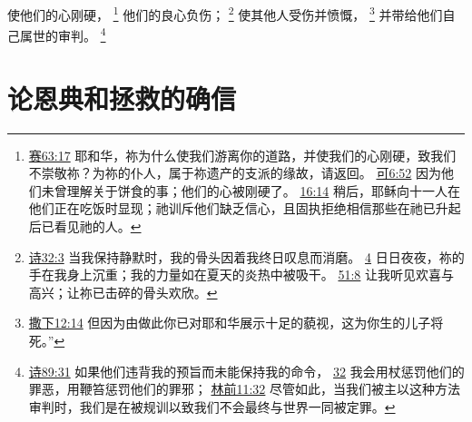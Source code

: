\documentclass[12pt, a4paper, oneside]{ctexart}
\begin{document}
	使他们的心刚硬，
	\footnote {
		\href{https://biblehub.com/isaiah/63-17.htm}{赛63:17} 耶和华，祢为什么使我们游离你的道路，并使我们的心刚硬，致我们不崇敬祢？为祢的仆人，属于祢遗产的支派的缘故，请返回。
		\href{https://biblehub.com/mark/6-52.htm}{可6:52} 因为他们未曾理解关于饼食的事；他们的心被刚硬了。
		\href{https://biblehub.com/mark/16-14.htm}{16:14} 稍后，耶稣向十一人在他们正在吃饭时显现；祂训斥他们缺乏信心，且固执拒绝相信那些在祂已升起后已看见祂的人。
	}
	他们的良心负伤；
	\footnote {
		\href{https://biblehub.com/psalms/32-3.htm}{诗32:3} 当我保持静默时，我的骨头因着我终日叹息而消磨。
		\href{https://biblehub.com/psalms/32-4.htm}{4} 日日夜夜，祢的手在我身上沉重；我的力量如在夏天的炎热中被吸干。
		\href{https://biblehub.com/psalms/51-8.htm}{51:8} 让我听见欢喜与高兴；让祢已击碎的骨头欢欣。
	}
	使其他人受伤并愤慨，
	\footnote {
		\href{https://biblehub.com/2_samuel/12-14.htm}{撒下12:14} 但因为由做此你已对耶和华展示十足的藐视，这为你生的儿子将死。”
	}
	并带给他们自己属世的审判。
	\footnote {
		\href{https://biblehub.com/psalms/89-31.htm}{诗89:31} 如果他们违背我的预旨而未能保持我的命令，
		\href{https://biblehub.com/psalms/89-32.htm}{32} 我会用杖惩罚他们的罪恶，用鞭笞惩罚他们的罪邪；
		\href{https://biblehub.com/1_corinthians/11-32.htm}{林前11:32} 尽管如此，当我们被主以这种方法审判时，我们是在被规训以致我们不会最终与世界一同被定罪。
	}

\section{论恩典和拯救的确信}
\end{document}

